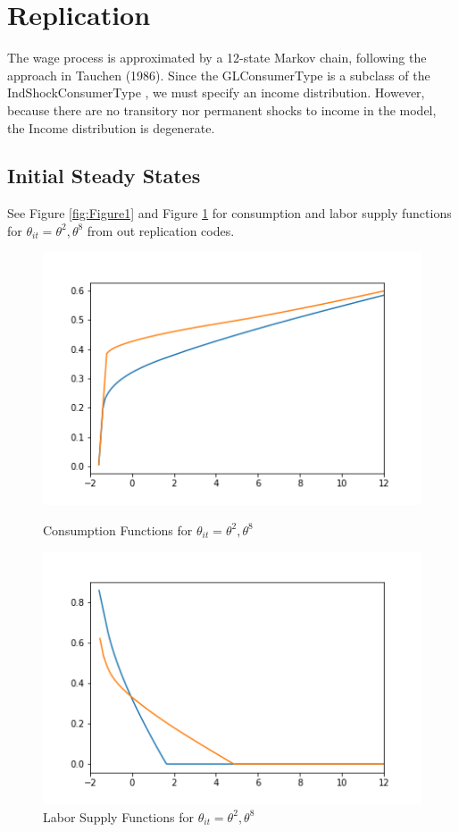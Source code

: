 \documentclass[./GL2017.tex]{subfiles}
\begin{document}
\hypertarget{Replication}{}
\section{Replication}



The wage process is approximated by a 12-state Markov chain, following the approach in Tauchen (1986).
Since the GLConsumerType is a subclass of the IndShockConsumerType , we must specify an income distribution. 
However, because there are no transitory nor permanent shocks to income in the model, the Income distribution is degenerate. 

\subsection{Initial Steady States }
See Figure \ref{fig:Figure1} and Figure \ref{fig:Figure2} for consumption and labor supply functions for $ \theta_{it} = \theta^{2} , \theta^{8}$ from out replication codes.

\begin{figure}
\centerline{\includegraphics[width=6in]{Figures/Figure1.png}}
\label{fig:Figure1}
\caption{Consumption Functions for  $ \theta_{it} = \theta^{2} , \theta^{8}$}
\centerline{\includegraphics[width=6in]{Figures/Figure2.png}}
\label{fig:Figure2}
\caption{Labor Supply Functions for $ \theta_{it} = \theta^{2} , \theta^{8}$}
\end{figure}
\end{document}
